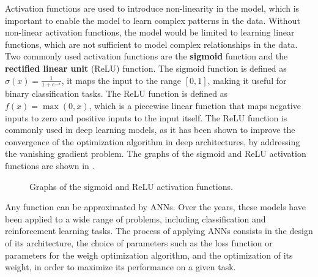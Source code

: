 Activation functions are used to introduce non-linearity in the model, which is important to enable the model to learn complex patterns in the data. Without
non-linear activation functions, the model would be limited to learning linear functions, which are not sufficient to model complex relationships in the data.
Two commonly used activation functions are the \textbf{sigmoid} function and the \textbf{rectified linear unit} (ReLU) function. The sigmoid function is defined as
$\sigma(x) = \frac{1}{1 + e^{-x}}$, it maps the input to the range $[0, 1]$, making it useful for binary classification tasks. The ReLU function is defined as
$f(x) = \max(0, x)$, which is a piecewise linear function that maps negative inputs to zero and positive inputs to the input itself. The ReLU function is
commonly used in deep learning models, as it has been shown to improve the convergence of the optimization algorithm in deep architectures, by addressing the
vanishing gradient problem. The graphs of the sigmoid and ReLU activation functions are shown in .

\begin{figure}[h]
    \begin{center}
        \caption{Graphs of the sigmoid and ReLU activation functions.}
        \label{fig:activation_functions}
    \end{center}
\end{figure}

Any function can be approximated by ANNs. Over the years, these models have been applied to a wide range of problems, including classification and reinforcement
learning tasks. The process of applying ANNs consists in the design of its architecture, the choice of parameters such as the loss function or parameters for the
weigh optimization algorithm, and the optimization of its weight, in order to maximize its performance on a given task.

